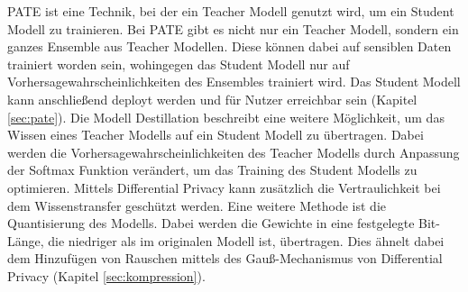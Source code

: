 PATE ist eine Technik, bei der ein Teacher Modell genutzt wird, um ein Student Modell zu trainieren.
Bei PATE gibt es nicht nur ein Teacher Modell, sondern ein ganzes Ensemble aus Teacher Modellen.
Diese können dabei auf sensiblen Daten trainiert worden sein, wohingegen das Student Modell nur auf Vorhersagewahrscheinlichkeiten des Ensembles trainiert wird.
Das Student Modell kann anschließend deployt werden und für Nutzer erreichbar sein (Kapitel \ref{sec:pate}).
Die Modell Destillation beschreibt eine weitere Möglichkeit, um das Wissen eines Teacher Modells auf ein Student Modell zu übertragen. 
Dabei werden die Vorhersagewahrscheinlichkeiten des Teacher Modells durch Anpassung der Softmax Funktion verändert, um das Training des Student Modells zu optimieren.
Mittels Differential Privacy kann zusätzlich die Vertraulichkeit bei dem Wissenstransfer geschützt werden.
Eine weitere Methode ist die Quantisierung des Modells.
Dabei werden die Gewichte in eine festgelegte Bit-Länge, die niedriger als im originalen Modell ist, übertragen.
Dies ähnelt dabei dem Hinzufügen von Rauschen mittels des Gauß-Mechanismus von Differential Privacy (Kapitel \ref{sec:kompression}).
